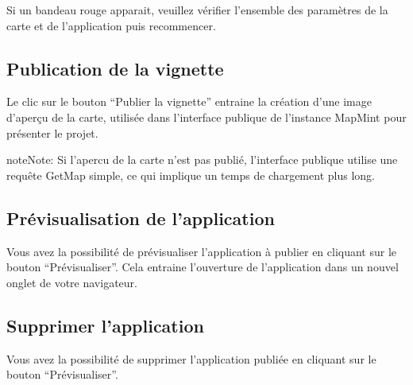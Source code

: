 \documentclass[letterpaper,10pt,french]{sphinxmanual}
\begin{document}
Si un bandeau rouge apparait, veuillez vérifier l'ensemble des paramètres de la carte et de l'application puis recommencer.


\subsection{Publication de la vignette}
\label{apps/appconfig:publication-de-la-vignette}
Le clic sur le bouton ``Publier la vignette'' entraine la création d'une
image d'aperçu de la carte, utilisée dans l'interface publique de
l'instance MapMint pour présenter le projet.

\begin{notice}{note}{Note:}
Si l'apercu de la carte n'est pas publié, l'interface publique
utilise une requête GetMap simple, ce qui implique un temps de
chargement plus long.
\end{notice}


\subsection{Prévisualisation de l'application}
\label{apps/appconfig:previsualisation-de-l-application}
Vous avez la possibilité de prévisualiser l'application à publier en
cliquant sur le bouton ``Prévisualiser''. Cela entraine l'ouverture de
l'application dans un nouvel onglet de votre navigateur.


\subsection{Supprimer l'application}
\label{apps/appconfig:supprimer-l-application}
Vous avez la possibilité de supprimer l'application publiée en
cliquant sur le bouton ``Prévisualiser''.



\renewcommand{\indexname}{Index}
\printindex
\end{document}
